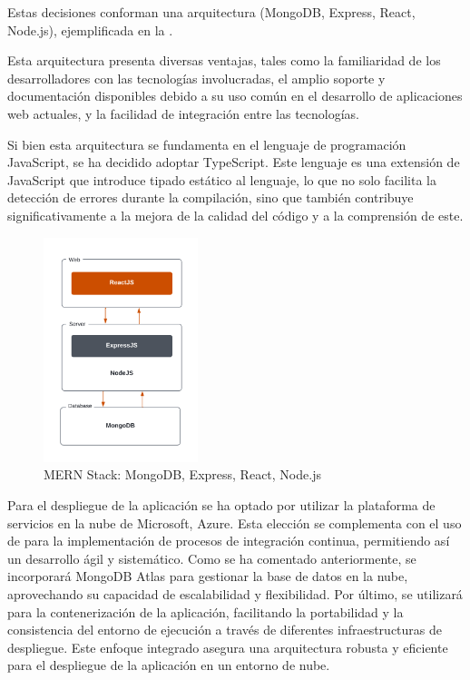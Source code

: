 Estas decisiones conforman una arquitectura  (MongoDB, Express, React, Node.js), ejemplificada en la . 

Esta arquitectura presenta diversas ventajas, tales como la familiaridad de los desarrolladores con las tecnologías involucradas, el amplio soporte y documentación disponibles debido a su uso común en el desarrollo de aplicaciones web actuales,
y la facilidad de integración entre las tecnologías.

Si bien esta arquitectura se fundamenta en el lenguaje de programación JavaScript, se ha decidido adoptar TypeScript. Este lenguaje es una extensión de JavaScript que introduce tipado estático al lenguaje, 
lo que no solo facilita la detección de errores durante la compilación, sino que también contribuye significativamente a la mejora de la calidad del código y a la comprensión de este.


\begin{figure}[H]
    \centering
    \includegraphics[width=0.4\textwidth]{figures/4-Arquitectura-tecnologica/4_MERN2.png}
    \caption{MERN Stack: MongoDB, Express, React, Node.js}
    \label{fig:arquitectura_mern}
    \hypertarget{fig:arquitectura_mern}{}
\end{figure}

Para el despliegue de la aplicación se ha optado por utilizar la plataforma de servicios en la nube de Microsoft, Azure.
Esta elección se complementa con el uso de 
para la implementación de procesos de integración continua, 
permitiendo así un desarrollo ágil y sistemático. Como se ha comentado anteriormente, se incorporará MongoDB Atlas para gestionar la base de datos en la nube, aprovechando su capacidad de escalabilidad 
y flexibilidad. Por último, se utilizará  
para la contenerización de la aplicación, facilitando la portabilidad y la consistencia del entorno de ejecución a través de diferentes infraestructuras de despliegue. 
Este enfoque integrado asegura una arquitectura robusta y eficiente para el despliegue de la aplicación en un entorno de nube.